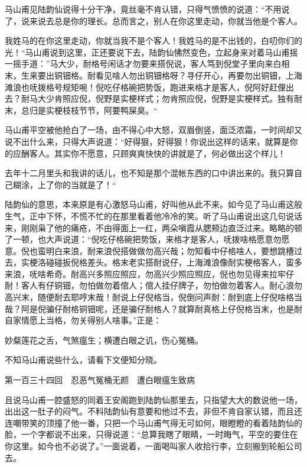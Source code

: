 \documentclass[12pt,UTF8]{ctexbook}
\begin{document}
{{{马山甫见陆韵仙说得十分干净，竟丝毫不肯认错，只得气愤愤的说道：“不用说了，说来说去总是你的理长。总而言之，别人在你这里走动，你就当他是个客人。

我姓马的在你这里走动，你就当我不是个客人！我姓马的是不出钱的，白叨你们的光！“马山甫说到这里，正还要说下去，陆韵仙怫然变色，立起身来对着马山甫摇一摇手道：”马大少，耐格号闲话才勿要来搭倪说，客人笃到倪堂子里向来白相末，生来要出铜钿格。耐看见啥人勿出铜钿格呀？寻仔开心，再要勿出铜钿，上海滩浪也呒拨格号规矩啘！倪吃仔格碗把势饭，跑进来格才是客人，倪阿好赶俚出去？耐马大少肯照应倪，倪野是实梗样式；勿肯照应倪，倪野是实梗样式。独有耐末，总归是实梗枝枝节节，阿要鸭屎臭。“

马山甫平空被他抢白了一场，由不得心中大怒，双眉倒竖，面泛浓霜，一时间却又说不出什么来，只得大声说道：“好得狠，好得狠！你说出这样的话来，就算是你的应酬客人。其实你不愿意，只顾爽爽快快的讲就是了，何必做出这个样儿！

去年十二月里头和我讲的话儿，也不知是那个混帐东西的口中讲出来的。我只算自己糊涂，上了你的当就是了！“

陆韵仙的意思，本来原是有心激怒马山甫，好叫他从此不来。如今见了马山甫这般生气，正中下怀，不慌不忙的在那里看着他冷冷的笑。听了马山甫说出这几句说话来，刚刚枭了他的痛疮，不由得面上一红，两朵嗔霞从腮颊边直泛过来。略略的顿了一顿，也大声说道：“倪吃仔格碗把势饭，来格才是客人，呒拨啥格愿意勿愿意。倪也蛮明白来浪，耐来浪倪搭做做勿高兴哉；勿知看中仔格啥人，要想跳槽过去，实梗洛碰碰扳倪格差头。格末老实搭耐说仔，上海滩浪像耐实梗格客人，蛮多来浪，呒啥希奇。耐高兴多照应照应，勿高兴少照应照应，倪也勿见得来拉牢仔耐！客人有仔铜钿，勿怕做勿着倌人；倌人挂仔牌子，勿怕做勿着客人。耐心浪勿高兴末，随便耐去耶哼末哉！耐说上仔倪格当，倪倒问声耐：耐到底上仔倪啥格当哉？阿是倪骗仔耐格铜钿呢，还是骗仔耐格人？就算耐真格上仔倪格当末，也是耐自家情愿上当格，勿关得别人啥事。”正是：

妙粲莲花之舌，气煞瘟生；横遭白眼之讥，伤心冤桶。

不知马山甫说些什么，请看下文便知分晓。





第一百三十四回　忍恶气冤桶无颜　遭白眼瘟生致病





且说马山甫一腔盛怒的同着王安阁跑到陆韵仙那里去，只指望大大的数说他一场，出出这一肚子的闷气。不料陆韵仙有意要和他过不去，非但不肯自家认错，而且还连嘲带笑的顶撞了他一番，只把一个马山甫气得无可如何，眼瞪瞪的看着陆韵仙的脸，一个字都说不出来，只得说道：“总算我瞎了眼睛，一时晦气，平空的要住在你这里。如今也不必说了。”一面说着，一面喝叫家人收拾行李，立刻搬到轮船公司去。

}}}
\end{document}
